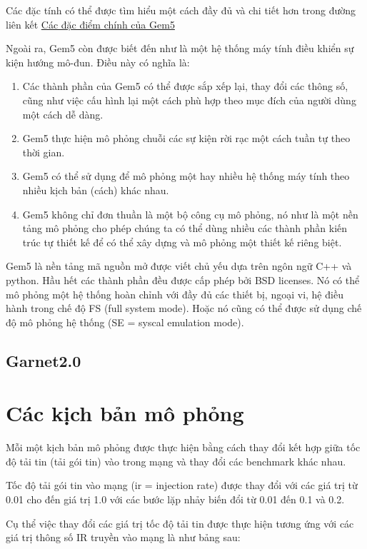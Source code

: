 \documentclass{article}
\begin{document}
Các đặc tính có thể được tìm hiểu một cách đầy đủ và chi tiết hơn trong đường liên kết \href{http://gem5.org/Main_Page}{Các đặc điểm chính của Gem5}

Ngoài ra, Gem5 còn được biết đến như là một hệ thống máy tính điều khiển sự kiện hướng mô-đun. Điều này có nghĩa là:

\begin{enumerate}
	\item Các thành phần của Gem5 có thể được sắp xếp lại, thay đổi các thông số, cũng như việc cấu hình lại một cách phù hợp theo mục đích của người dùng một cách dễ dàng.
	\item Gem5 thực hiện mô phỏng chuỗi các sự kiện rời rạc một cách tuần tự theo thời gian.
	\item Gem5 có thể sử dụng để mô phỏng một hay nhiều hệ thống máy tính theo nhiều kịch bản (cách) khác nhau.
	\item Gem5 không chỉ đơn thuần là một bộ công cụ mô phỏng, nó như là một nền tảng mô phỏng cho phép chúng ta có thể dùng nhiều các thành phần kiến trúc tự thiết kế để có thể xây dựng và mô phỏng một thiết kế riêng biệt. 
\end{enumerate}

Gem5 là nền tảng mã nguồn mở được viết chủ yếu dựa trên ngôn ngữ C++ và python. Hầu hết các thành phần đều được cấp phép bởi BSD licenses. Nó có thể mô phỏng một hệ thống hoàn chỉnh với đầy đủ các thiết bị, ngoại vi, hệ điều hành trong chế độ FS (full system mode). Hoặc nó cũng có thể được sử dụng chế độ mô phỏng hệ thống (SE = syscal emulation mode).
\subsection{Garnet2.0}


\section{Các kịch bản mô phỏng}

Mỗi một kịch bản mô phỏng được thực hiện bằng cách thay đổi kết hợp giữa tốc độ tải tin (tải gói tin) vào trong mạng và thay đổi các benchmark khác nhau. 

Tốc độ tải gói tin vào mạng (ir = injection rate) được thay đổi với các giá trị từ 0.01 cho đến giá trị 1.0 với các bước lặp nhảy biến đổi từ 0.01 đến 0.1 và 0.2.

Cụ thể việc thay đổi các giá trị tốc độ tải tin được thực hiện tương ứng với các giá trị thông số IR truyền vào mạng là như bảng sau:
\end{document}
